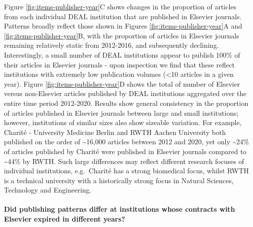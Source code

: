 \documentclass[
]{article}
\begin{document}
Figure \ref{fig:items-publisher-year}C shows changes in the proportion of articles from each individual DEAL institution that are published in Elsevier journals. Patterns broadly reflect those shown in Figures \ref{fig:items-publisher-year}A and \ref{fig:items-publisher-year}B, with the proportion of articles in Elsevier journals remaining relatively static from 2012-2016, and subsequently declining. Interestingly, a small number of DEAL institutions appear to publish 100\% of their articles in Elsevier journals - upon inspection we find that these reflect institutions with extremely low publication volumes (\textless10 articles in a given year). Figure \ref{fig:items-publisher-year}D shows the total of number of Elsevier versus non-Elsevier articles published by DEAL institutions aggregated over the entire time period 2012-2020. Results show general consistency in the proportion of articles published in Elsevier journals between large and small institutions; however, institutions of similar sizes also show sizeable variation. For example, Charité - University Medicine Berlin and RWTH Aachen University both published on the order of \textasciitilde16,000 articles between 2012 and 2020, yet only \textasciitilde24\% of articles published by Charité were published in Elsevier journals compared to \textasciitilde44\% by RWTH. Such large differences may reflect different research focuses of individual institutions, e.g.~Charité has a strong biomedical focus, whilst RWTH is a technical university with a historically strong focus in Natural Sciences, Technology and Engineering.

\hypertarget{did-publishing-patterns-differ-at-institutions-whose-contracts-with-elsevier-expired-in-different-years}{%
\paragraph{Did publishing patterns differ at institutions whose contracts with Elsevier expired in different years?}\label{did-publishing-patterns-differ-at-institutions-whose-contracts-with-elsevier-expired-in-different-years}}
\end{document}
